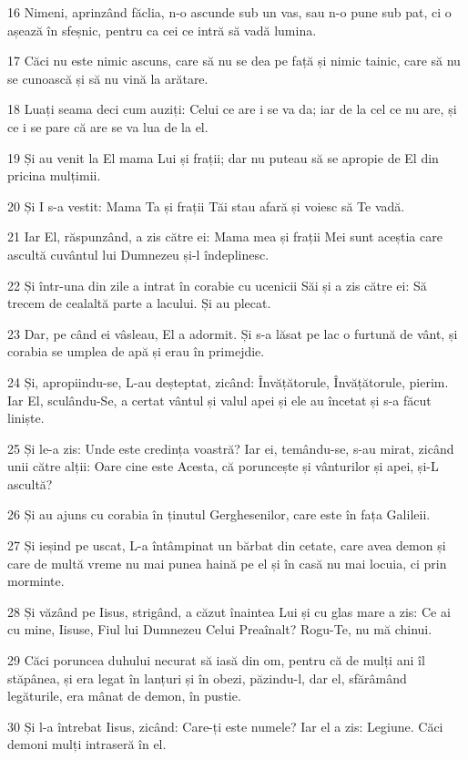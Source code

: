 \par 16 Nimeni, aprinzând făclia, n-o ascunde sub un vas, sau n-o pune sub pat, ci o așează în sfeșnic, pentru ca cei ce intră să vadă lumina.
\par 17 Căci nu este nimic ascuns, care să nu se dea pe față și nimic tainic, care să nu se cunoască și să nu vină la arătare.
\par 18 Luați seama deci cum auziți: Celui ce are i se va da; iar de la cel ce nu are, și ce i se pare că are se va lua de la el.
\par 19 Și au venit la El mama Lui și frații; dar nu puteau să se apropie de El din pricina mulțimii.
\par 20 Și I s-a vestit: Mama Ta și frații Tăi stau afară și voiesc să Te vadă.
\par 21 Iar El, răspunzând, a zis către ei: Mama mea și frații Mei sunt aceștia care ascultă cuvântul lui Dumnezeu și-l îndeplinesc.
\par 22 Și într-una din zile a intrat în corabie cu ucenicii Săi și a zis către ei: Să trecem de cealaltă parte a lacului. Și au plecat.
\par 23 Dar, pe când ei vâsleau, El a adormit. Și s-a lăsat pe lac o furtună de vânt, și corabia se umplea de apă și erau în primejdie.
\par 24 Și, apropiindu-se, L-au deșteptat, zicând: Învățătorule, Învățătorule, pierim. Iar El, sculându-Se, a certat vântul și valul apei și ele au încetat și s-a făcut liniște.
\par 25 Și le-a zis: Unde este credința voastră? Iar ei, temându-se, s-au mirat, zicând unii către alții: Oare cine este Acesta, că poruncește și vânturilor și apei, și-L ascultă?
\par 26 Și au ajuns cu corabia în ținutul Gerghesenilor, care este în fața Galileii.
\par 27 Și ieșind pe uscat, L-a întâmpinat un bărbat din cetate, care avea demon și care de multă vreme nu mai punea haină pe el și în casă nu mai locuia, ci prin morminte.
\par 28 Și văzând pe Iisus, strigând, a căzut înaintea Lui și cu glas mare a zis: Ce ai cu mine, Iisuse, Fiul lui Dumnezeu Celui Preaînalt? Rogu-Te, nu mă chinui.
\par 29 Căci poruncea duhului necurat să iasă din om, pentru că de mulți ani îl stăpânea, și era legat în lanțuri și în obezi, păzindu-l, dar el, sfărâmând legăturile, era mânat de demon, în pustie.
\par 30 Și l-a întrebat Iisus, zicând: Care-ți este numele? Iar el a zis: Legiune. Căci demoni mulți intraseră în el.

